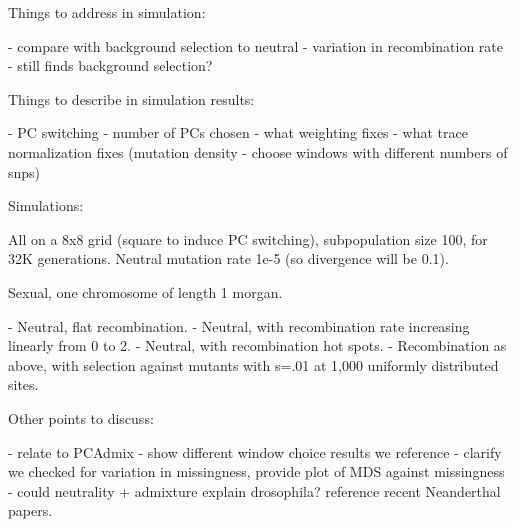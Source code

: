 Things to address in simulation:

- compare with background selection to neutral
- variation in recombination rate - still finds background selection?

Things to describe in simulation results:

- PC switching
- number of PCs chosen
- what weighting fixes
- what trace normalization fixes 
    (mutation density - choose windows with different numbers of snps)

Simulations:

All on a 8x8 grid (square to induce PC switching),
subpopulation size 100, for 32K generations.
Neutral mutation rate 1e-5 (so divergence will be 0.1).

Sexual, one chromosome of length 1 morgan.

- Neutral, flat recombination.
- Neutral, with recombination rate increasing linearly from 0 to 2.
- Neutral, with recombination hot spots.
- Recombination as above, with selection against mutants with s=.01 at 1,000 uniformly distributed sites.


Other points to discuss:

- relate to PCAdmix
- show different window choice results we reference
- clarify we checked for variation in missingness, provide plot of MDS against missingness
- could neutrality + admixture explain drosophila? reference recent Neanderthal papers.

